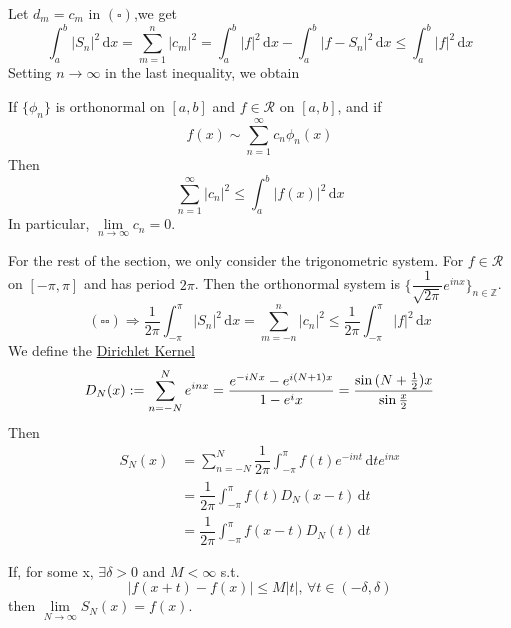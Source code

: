 Let  $ d_m=c_m  $ in  $ (\square) $,we get
\begin{equation}
    \int_{a }^{b } |S_n|^2\, \mathrm{d}x=\sum\limits_{m=1 }^{n } |c_m|^2= \int_{a}^{b } |f|^2\, \mathrm{d}x -\int_{a }^{b } |f-S_n|^2 \, \mathrm{d}x  \leqslant \int_{a }^{b } |f|^2\, \mathrm{d}x\tag{ $ \square\square $ }     
\end{equation} 
Setting  $ n\rightarrow \infty  $ in the last inequality, we obtain
\begin{theorem}
    If  $ \{\phi_n \} $ is orthonormal on  $ [a,b] $ and  $ f\in \mathscr{R } $ on $ [a,b]  $, and if 
    \[f(x)\sim \sum\limits_{n=1 }^{\infty} c_n\phi_n(x)\]
    Then \[\sum\limits_{n=1}^{\infty}|c_n|^2  \leqslant \int_{a }^{b } |f(x)|^2\, \mathrm{d}x  \] 
    In particular,  $ \lim\limits_{n\to\infty } c_n=0  $. 
\end{theorem}
For the rest of the section, we only consider the trigonometric system. For  $ f\in\mathscr{R } $ on  $ [-\pi,\pi] $ and has period  $ 2\pi  $. 
Then the orthonormal system is  $ \{\dfrac{1}{\sqrt{2\pi}}e^{inx}\}_{n\in\mathbb{Z}} $.\\
  \begin{equation}
     (\square\square)\Rightarrow \dfrac{1 }{2\pi }\int_{-\pi }^{\pi } |S_n|^2\, \mathrm{d}x=\sum\limits_{m=-n }^{n } |c_n|^2 \leqslant \dfrac{1 }{2\pi }\int_{-\pi }^{\pi } |f|^2\, \mathrm{d}x\tag{$ \triangle $}
  \end{equation} 
  We define the \underline{Dirichlet Kernel}
  \begin{equation}
    D_N(x):=\sum\limits_{n=-N }^{N } e^{inx }=\frac{e^{-iNx }-e^{i(N+1)x}}{1-e^ix}=\frac{\sin{(N+\frac{1 }{2 })x}}{\sin{\frac{x }{2}}} \notag
  \end{equation}
  Then 
  \begin{align*}
    S_N(x)&=\sum\limits_{n=-N }^{N } \dfrac{1 }{2\pi }\int_{-\pi }^{\pi } f(t)e^{-int}\, \mathrm{d}t e^{inx} \\
    &=\dfrac{1 }{2\pi }\int_{-\pi }^{\pi } f(t)D_N(x-t)\, \mathrm{d}t \\
    &=\dfrac{1 }{2\pi }\int_{-\pi }^{\pi } f(x-t)D_N(t)\, \mathrm{d}t \tag{$ \square\square\square $}   
  \end{align*}
  \begin{theorem}
    If,  for some x,  $ \exists\delta>0  $ and  $ M<\infty  $ s.t.
    \[|f(x+t)-f(x)| \leqslant M|t|,\,\forall t \in(-\delta,\delta)\]
    then  $ \lim\limits_{N\to\infty } S_N(x)=f(x)  $. 
  \end{theorem}
